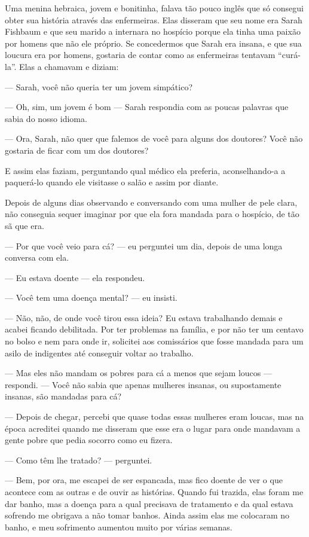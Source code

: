 Uma menina hebraica, jovem e bonitinha, falava tão pouco inglês que só
consegui obter sua história através das enfermeiras. Elas disseram que
seu nome era Sarah Fishbaum e que seu marido a internara no hospício
porque ela tinha uma paixão por homens que não ele próprio. Se
concedermos que Sarah era insana, e que sua loucura era por homens,
gostaria de contar como as enfermeiras tentavam ``curá-la''. Elas a
chamavam e diziam:

--- Sarah, você não queria ter um jovem simpático?

--- Oh, sim, um jovem é bom --- Sarah respondia com as poucas palavras
que sabia do nosso idioma.

--- Ora, Sarah, não quer que falemos de você para alguns dos doutores?
Você não gostaria de ficar com um dos doutores?

E assim elas faziam, perguntando qual médico ela preferia,
aconselhando-a a paquerá-lo quando ele visitasse o salão e assim por
diante.

Depois de alguns dias observando e conversando com uma mulher de pele
clara, não conseguia sequer imaginar por que ela fora mandada para o
hospício, de tão sã que era.

--- Por que você veio para cá? --- eu perguntei um dia, depois de uma
longa conversa com ela.

--- Eu estava doente --- ela respondeu.

--- Você tem uma doença mental? --- eu insisti.

--- Não, não, de onde você tirou essa ideia? Eu estava trabalhando
demais e acabei ficando debilitada. Por ter problemas na família, e por
não ter um centavo no bolso e nem para onde ir, solicitei aos
comissários que fosse mandada para um asilo de indigentes até conseguir
voltar ao trabalho.

--- Mas eles não mandam os pobres para cá a menos que sejam loucos ---
respondi. --- Você não sabia que apenas mulheres insanas, ou
supostamente insanas, são mandadas para cá?

--- Depois de chegar, percebi que quase todas essas mulheres eram
loucas, mas na época acreditei quando me disseram que esse era o lugar
para onde mandavam a gente pobre que pedia socorro como eu fizera.

--- Como têm lhe tratado? --- perguntei. 

--- Bem, por ora, me escapei de ser espancada, mas fico doente de ver o que acontece com as outras e
de ouvir as histórias. Quando fui trazida, elas foram me dar banho, mas
a doença para a qual precisava de tratamento e da qual estava sofrendo
me obrigava a não tomar banhos. Ainda assim elas me colocaram no banho,
e meu sofrimento aumentou muito por várias semanas.

